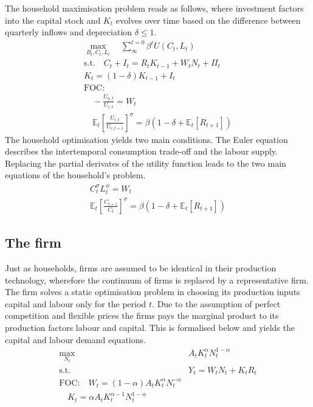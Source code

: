 \documentclass[12pt,a4paper,english]{article} %
\newcommand{\E}{\mathbb{E}} %
\begin{document}
	The household maximisation problem reads as follows, where investment factors into the capital stock and $K_t$ evolves over time based on the difference between quarterly inflows and depreciation $\delta \leq 1$.
	\begin{equation}
		\begin{aligned}
			\max_{B_t, C_t, L_t} \quad \sum_{\infty}^{t=0} \beta^{t} U(C_{t}, L_{t}) \\
			\textrm{s.t.} \quad C_t + I_t = R_t K_{t-1} + W_t N_t + \Pi_t \\
						  K_t = (1 - \delta) K_{t-1} + I_t \\
			\textrm{FOC:}\\
							 \quad - \frac{U_{n,t}}{U_{c, t}} = W_t \\
							 \quad	\E_t \left[ \frac{U_{c,t}}{U_{c,t+1}} \right]^{\sigma} = \beta \left( 1 - \delta + \E_t[R_{t+1}]\right)
		\end{aligned}
	\end{equation}
	The household optimisation yields two main conditions. The Euler equation describes the intertemporal consumption trade-off and the labour supply. Replacing the partial derivates of the utility function leads to the two main equations of the household's problem.
	\begin{equation} \label{eq:rbc_hh_foc}
		\begin{aligned}
			C_t^\sigma L_t^\phi	= W_t \\
			\E_t \left[ \frac{C_{t+1}}{C_t} \right]^\sigma = \beta \left(1 - \delta  + \E_t [R_{t+1}] \right)
		\end{aligned}
	\end{equation}

	\subsection{The firm}
	Just as households, firms are assumed to be identical in their production technology, wherefore the continuum of firms is replaced by a representative firm. The firm solves a static optimisation problem in choosing its production inputs capital and labour only for the period $t$. Due to the assumption of perfect competition and flexible prices the firms pays the marginal product to its production factors labour and capital. This is formalised below and yields the capital and labour demand equations.
	\begin{equation} \label{eq:rbc_firm_foc}
		\begin{aligned}
			\max_{N_t} \quad & A_t K_t^\alpha N_t^{1 - \alpha} \\
			\textrm{s.t.} \quad & Y_t = W_t N_t + K_t R_t\\
			\textrm{FOC:} \quad W_t = (1 - \alpha) A_t K_t^\alpha N_t^{-\alpha}\\
							\quad K_t = \alpha A_t K_t^{\alpha -1} N_t^{1-\alpha}
		\end{aligned}
	\end{equation}
\end{document}
